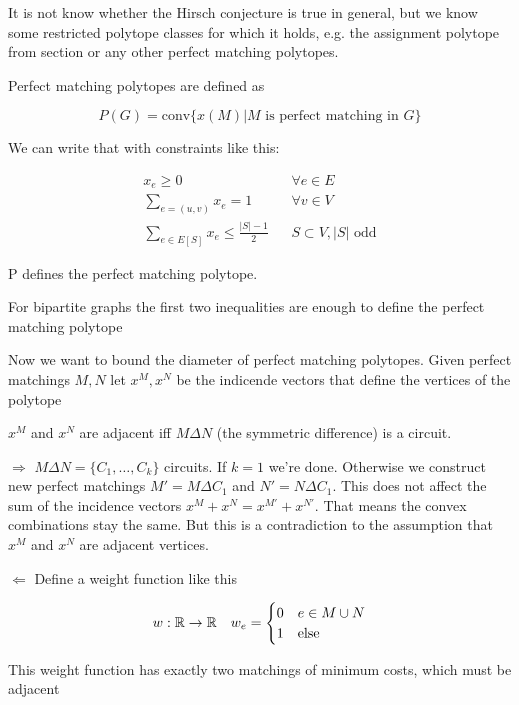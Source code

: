 It is not know whether the Hirsch conjecture is true in general, but we know some restricted polytope classes for which it holds, e.g. the assignment polytope from section \label{sec:maxAssignment} or any other perfect matching polytopes.

Perfect matching polytopes are defined as

\[P(G) = \text{conv} \{x(M) | M \text{ is perfect matching in }G\}\]

We can write that with constraints like this:

\begin{align*}
x_e \geq 0 &&\forall e\in E\\
\sum_{e=(u,v)} x_e = 1 &&\forall v\in V\\
\sum_{e\in E[S]} x_e \leq \frac{|S|-1}{2} &&S\subset V, |S| \text{ odd}
\end{align*}

\begin{thm} P defines the perfect matching polytope.\end{thm}
\begin{thm} For bipartite graphs the first two inequalities are enough to define the perfect matching polytope\end{thm}

Now we want to bound the diameter of perfect matching polytopes. Given perfect matchings $M,N$ let $x^M,x^N$ be the indicende vectors that define the vertices of the polytope

\begin{lem} $x^M$ and $x^N$ are adjacent iff $M\Delta N$ (the symmetric difference) is a circuit.\end{lem}

\begin{pr} $\Rightarrow$ $M\Delta N = \{C_1,\ldots, C_k\}$ circuits. If $k=1$ we're done. Otherwise we construct new perfect matchings $M'=M\Delta C_1$ and $N'=N\Delta C_1$. This does not affect the sum of the incidence vectors $x^M+x^N=x^{M'} +x^{N'}$. That means the convex combinations stay the same. But this is a contradiction to the assumption that $x^M$ and $x^N$ are adjacent vertices.

$\Leftarrow$ Define a weight function like this

\[w:\mathbb{R} \rightarrow \mathbb{R} \quad w_e=\begin{cases}0 & e\in M\cup N\\ 1 &\text{else}\end{cases}\]

This weight function has exactly two matchings of minimum costs, which must be adjacent
\end{pr}
